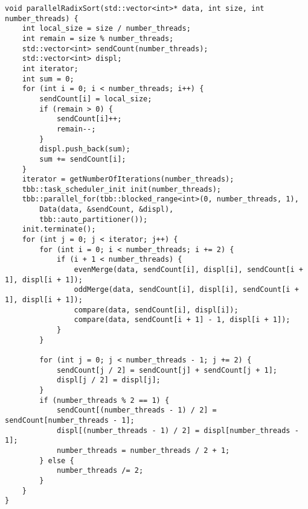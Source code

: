 \documentclass{report}
\begin{document}
\begin{lstlisting}
void parallelRadixSort(std::vector<int>* data, int size, int number_threads) {
    int local_size = size / number_threads;
    int remain = size % number_threads;
    std::vector<int> sendCount(number_threads);
    std::vector<int> displ;
    int iterator;
    int sum = 0;
    for (int i = 0; i < number_threads; i++) {
        sendCount[i] = local_size;
        if (remain > 0) {
            sendCount[i]++;
            remain--;
        }
        displ.push_back(sum);
        sum += sendCount[i];
    }
    iterator = getNumberOfIterations(number_threads);
    tbb::task_scheduler_init init(number_threads);
    tbb::parallel_for(tbb::blocked_range<int>(0, number_threads, 1),
        Data(data, &sendCount, &displ),
        tbb::auto_partitioner());
    init.terminate();
    for (int j = 0; j < iterator; j++) {
        for (int i = 0; i < number_threads; i += 2) {
            if (i + 1 < number_threads) {
                evenMerge(data, sendCount[i], displ[i], sendCount[i + 1], displ[i + 1]);
                oddMerge(data, sendCount[i], displ[i], sendCount[i + 1], displ[i + 1]);
                compare(data, sendCount[i], displ[i]);
                compare(data, sendCount[i + 1] - 1, displ[i + 1]);
            }
        }

        for (int j = 0; j < number_threads - 1; j += 2) {
            sendCount[j / 2] = sendCount[j] + sendCount[j + 1];
            displ[j / 2] = displ[j];
        }
        if (number_threads % 2 == 1) {
            sendCount[(number_threads - 1) / 2] = sendCount[number_threads - 1];
            displ[(number_threads - 1) / 2] = displ[number_threads - 1];
            number_threads = number_threads / 2 + 1;
        } else {
            number_threads /= 2;
        }
    }
}

\end{lstlisting}
\end{document}
